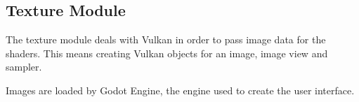 \subsection{Texture Module}
The texture module deals with Vulkan in order to pass image data for the
shaders. This means creating Vulkan objects for an image, image view and
sampler.

Images are loaded by Godot Engine, the engine used to create the user interface.

